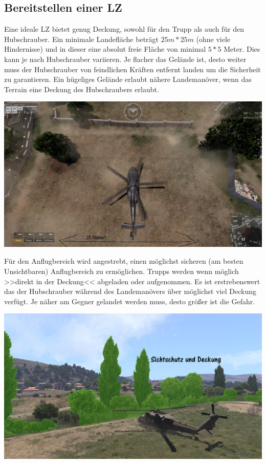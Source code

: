 \subsection{Bereitstellen einer \acf{LZ}}
	Eine ideale \ac{LZ} bietet genug Deckung, sowohl für den Trupp als auch für den Hubschrauber. Ein minimale Landefläche beträgt $25m * 25m$ (ohne viele Hindernisse) und in dieser eine absolut freie Fläche von minimal $5 * 5$ Meter. Dies kann je nach Hubschrauber variieren. Je flacher das Gelände ist, desto weiter muss der Hubschrauber von feindlichen Kräften entfernt landen um die Sicherheit zu garantieren. Ein hügeliges Gelände erlaubt nähere Landemanöver, wenn das Terrain eine Deckung des Hubschraubers erlaubt. \\
	\begin{minipage}[t]{1\textwidth}
		\includegraphics[width=\textwidth]{./img/fortgeschrittenes/hubschrauberUndInfanterie/landezone}
	\end{minipage}

	Für den Anflugbereich wird angestrebt, einen möglichst sicheren (am besten Unsichtbaren) Anflugbereich zu ermöglichen. Trupps werden wenn möglich >>direkt in der Deckung<< abgeladen oder aufgenommen. Es ist erstrebenswert das der Hubschrauber während des Landemanövers über möglichst viel Deckung verfügt. Je näher am Gegner gelandet werden muss, desto größer ist die Gefahr. \\
	\begin{minipage}[t]{1\textwidth}
		\includegraphics[width=\textwidth]{./img/fortgeschrittenes/hubschrauberUndInfanterie/verdeckte-landung}
	\end{minipage}

